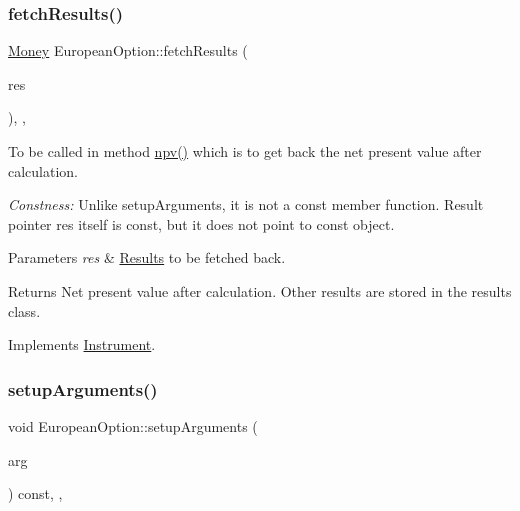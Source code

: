 \subsubsection{\texorpdfstring{fetch\+Results()}{fetchResults()}}
{\footnotesize\ttfamily \hyperlink{_name_def_8h_a5a9d48c16a694e9a2d9f1eca730dc8c5}{Money} European\+Option\+::fetch\+Results (\begin{DoxyParamCaption}\item[{\hyperlink{class_pricing_engine_1_1_results}{Pricing\+Engine\+::\+Results} $\ast$const}]{res }\end{DoxyParamCaption})\hspace{0.3cm}{\ttfamily [override]}, {\ttfamily [private]}, {\ttfamily [virtual]}}



To be called in method \hyperlink{class_instrument_aa750f2ae95a21d65a073da3171e8d084}{npv()} which is to get back the net present value after calculation. 

{\itshape Constness\+:} Unlike setup\+Arguments, it is not a const member function. Result pointer res itself is const, but it does not point to const object. 
\begin{DoxyParams}{Parameters}
{\em res} & \hyperlink{class_european_option_1_1_results}{Results} to be fetched back. \\
\hline
\end{DoxyParams}
\begin{DoxyReturn}{Returns}
Net present value after calculation. Other results are stored in the results class. 
\end{DoxyReturn}


Implements \hyperlink{class_instrument_a381f093402f789ad7c0ffecd233167dc}{Instrument}.

\hypertarget{class_european_option_a77e3bc17dbcf317561c4920f6bfa84de}{}\label{class_european_option_a77e3bc17dbcf317561c4920f6bfa84de} 
\subsubsection{\texorpdfstring{setup\+Arguments()}{setupArguments()}}
{\footnotesize\ttfamily void European\+Option\+::setup\+Arguments (\begin{DoxyParamCaption}\item[{\hyperlink{class_pricing_engine_1_1_arguments}{Pricing\+Engine\+::\+Arguments} $\ast$const}]{arg }\end{DoxyParamCaption}) const\hspace{0.3cm}{\ttfamily [override]}, {\ttfamily [private]}, {\ttfamily [virtual]}}



